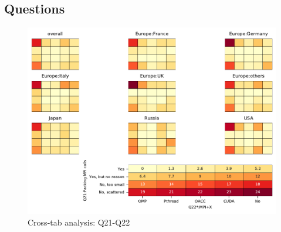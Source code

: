 
\subsection{Questions}


\begin{figure}
\begin{center}
\includegraphics[width=12cm]{../pdfs/Q21-Q22.pdf}
\caption{Cross-tab analysis: Q21-Q22}
\label{fig:Q21-Q22}
\end{center}
\end{figure}

